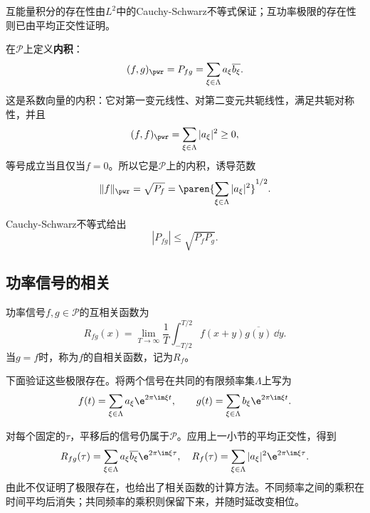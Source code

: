 互能量积分的存在性由$L^2$中的Cauchy-Schwarz不等式保证；互功率极限的存在性则已由平均正交性证明。

在$\mathcal{P}$上定义\textbf{内积}：
\begin{equation}
    (f,g)_{\pwr}=P_{fg}
    =\sum_{\xi\in\Lambda}a_\xi\overline{b_\xi}.
\end{equation}
这是系数向量的内积：它对第一变元线性、对第二变元共轭线性，满足共轭对称性，并且
\begin{equation}
    (f,f)_{\pwr}=\sum_{\xi\in\Lambda}|a_\xi|^2\ge 0,
\end{equation}
等号成立当且仅当$f=0$。所以它是$\mathcal{P}$上的内积，诱导范数
\begin{equation}
    \|f\|_{\pwr}=\sqrt{P_f}
    =\paren{\sum_{\xi\in\Lambda}|a_\xi|^2}^{1/2}.
\end{equation}

Cauchy-Schwarz不等式给出
\begin{equation}
    |P_{fg}|\le\sqrt{P_fP_g}.
\end{equation}

\subsection{功率信号的相关}\label{sub:power_corelation}

\begin{definition}[功率信号的相关]\label{def:power_correlation}
    功率信号$f,g\in \mathcal{P}$的互相关函数为
    \begin{equation}
        R_{fg}(x)=\lim_{T\to\infty}\frac{1}{T}\int_{-T/2}^{T/2}f(x+y)\overline{g(y)}\,\dd y.
    \end{equation}
    当$g=f$时，称为$f$的自相关函数，记为$R_f$。
\end{definition}

下面验证这些极限存在。将两个信号在共同的有限频率集$\Lambda$上写为
\begin{equation}
    f(t)=\sum_{\xi\in\Lambda}a_\xi \e^{2\pi\im\xi t},\qquad g(t)=\sum_{\xi\in\Lambda}b_\xi \e^{2\pi\im\xi t}.
\end{equation}

对每个固定的$\tau$，平移后的信号仍属于$\mathcal{P}$。应用上一小节的平均正交性，得到
\begin{equation}
    R_{fg}(\tau)=\sum_{\xi\in\Lambda}a_\xi\overline{b_\xi}\e^{2\pi\im\xi\tau},\quad R_f(\tau)=\sum_{\xi\in\Lambda}|a_\xi|^2\e^{2\pi\im\xi\tau}.
\end{equation}
由此不仅证明了极限存在，也给出了相关函数的计算方法。不同频率之间的乘积在时间平均后消失；共同频率的乘积则保留下来，并随时延改变相位。

